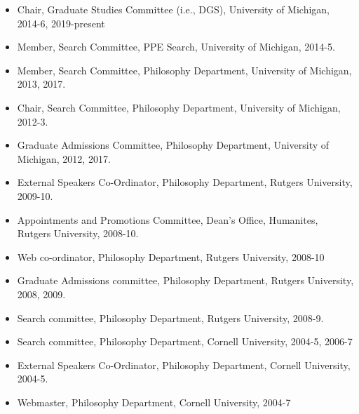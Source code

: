\documentclass[
  10pt,
  letterpaper,
  DIV=11,
  numbers=noendperiod,
  twoside]{scrartcl}
\providecommand{\tightlist}{%
  \setlength{\itemsep}{0pt}\setlength{\parskip}{0pt}}
\begin{document}
\begin{itemize}
\tightlist
\item
  Chair, Graduate Studies Committee (i.e., DGS), University of Michigan,
  2014-6, 2019-present
\item
  Member, Search Committee, PPE Search, University of Michigan, 2014-5.
\item
  Member, Search Committee, Philosophy Department, University of
  Michigan, 2013, 2017.
\item
  Chair, Search Committee, Philosophy Department, University of
  Michigan, 2012-3.
\item
  Graduate Admissions Committee, Philosophy Department, University of
  Michigan, 2012, 2017.
\item
  External Speakers Co-Ordinator, Philosophy Department, Rutgers
  University, 2009-10.
\item
  Appointments and Promotions Committee, Dean's Office, Humanites,
  Rutgers University, 2008-10.
\item
  Web co-ordinator, Philosophy Department, Rutgers University, 2008-10
\item
  Graduate Admissions committee, Philosophy Department, Rutgers
  University, 2008, 2009.
\item
  Search committee, Philosophy Department, Rutgers University, 2008-9.
\item
  Search committee, Philosophy Department, Cornell University, 2004-5,
  2006-7
\item
  External Speakers Co-Ordinator, Philosophy Department, Cornell
  University, 2004-5.
\item
  Webmaster, Philosophy Department, Cornell University, 2004-7
\end{itemize}
\end{document}
